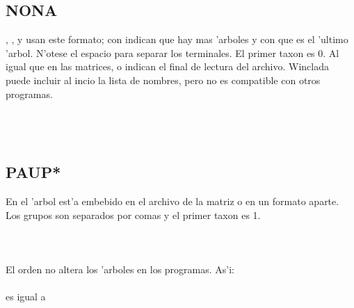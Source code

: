 \subsection{NONA}
\noindent
{}, ,  y  usan este formato; con \Cmd{*} indican que hay mas 'arboles y con \Cmd{;} que es el 'ultimo 'arbol. N'otese el espacio para separar los terminales. El primer taxon es 0. Al igual que en las matrices,  o  indican el final de lectura del archivo. Winclada puede incluir al incio la lista de nombres, pero no es compatible con otros programas.\\
\\
\noindent
{}\\
\\
\subsection{PAUP*}
En  el 'arbol est'a embebido en el archivo de la matriz o en un formato aparte. Los grupos son separados por comas y  el primer taxon es 1.\\
\\
\noindent
{}\\
\\
El orden no altera los 'arboles en los programas. As'i:\\
\\
es igual a\\
